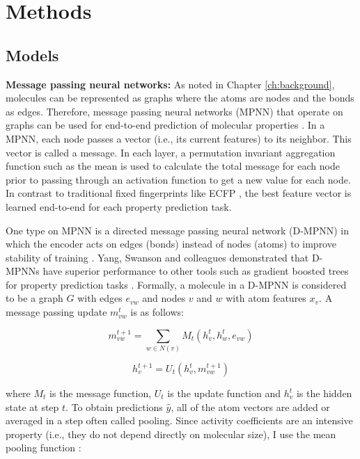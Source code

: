 \section{Methods}
\subsection{Models}

\noindent
\textbf{Message passing neural networks:} As noted in Chapter \ref{ch:background}, molecules can be represented as graphs where the atoms are nodes and the bonds as edges. Therefore, message passing neural networks (MPNN) that operate on graphs can be used for end-to-end prediction of molecular properties \cite{Gilmer2017}.  In a MPNN, each node passes a vector (i.e., its current features) to its neighbor. This  vector is called a message. In each layer, a permutation invariant aggregation function such as the mean is used to calculate the total message for each node prior to passing through an activation function to get a new value for each node.  In contrast to traditional fixed fingerprints like ECFP \cite{Rogers2010}, the best feature vector is learned end-to-end for each property prediction task.

One type on MPNN is a directed message passing neural network (D-MPNN) in which the encoder acts on edges (bonds) instead of nodes (atoms) to improve stability of training \cite{Yang2019}. Yang, Swanson and colleagues demonstrated that D-MPNNs have superior performance to other tools such as gradient boosted trees for property prediction tasks \cite{Yang2019}. Formally, a molecule in a D-MPNN is considered to be a graph $G$ with edges $e_{vw}$ and nodes $v$ and $w$ with atom features $x_v$. A message passing update $m_{vw}^{t}$ is as follows:

\begin{equation}
    m_{vw}^{t+1} = \sum_{w\in N(v)} M_t(h_v^t, h_w^t, e_{vw})
\end{equation}

\begin{equation}
    h_v^{t+1} = U_t(h_v^t, m_{vw}^{t+1})
\end{equation}

where $M_t$ is the message function, $U_t$ is the update function and $h_v^{t}$ is the hidden state at step $t$. To obtain predictions $\hat y$, all of the atom vectors are added or averaged in a step often called pooling. Since activity coefficients are an intensive property (i.e., they do not depend directly on molecular size), I use the mean pooling function \cite{Schweidtmann2023}:

